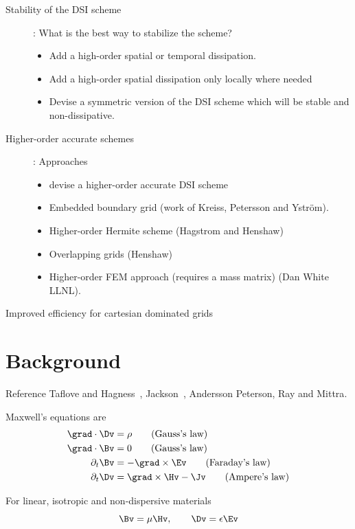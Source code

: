 \documentclass[10pt]{article}
\begin{document}
\begin{description}
  \item[Stability of the DSI scheme] : What is the best way to stabilize the scheme?
    \begin{itemize}
       \item Add a high-order spatial or temporal dissipation.
       \item Add a high-order spatial dissipation only locally where needed
       \item Devise a symmetric version of the DSI scheme which will be stable and non-dissipative.
    \end{itemize}
  \item[Higher-order accurate schemes]: Approaches
    \begin{itemize}
       \item devise a higher-order accurate DSI scheme
       \item Embedded boundary grid (work of Kreiss, Petersson and Ystr\"om).
       \item Higher-order Hermite scheme (Hagstrom and Henshaw)
       \item Overlapping grids (Henshaw)
       \item Higher-order FEM approach (requires a mass matrix) (Dan White LLNL).
    \end{itemize}
  \item[Improved efficiency for cartesian dominated grids]
\end{description}

\section{Background}

Reference Taflove and Hagness~\cite{Taflove2000}, Jackson~\cite{Jackson}, Andersson\cite{Andersson2001}
Peterson, Ray and Mittra\cite{Peterson98}.

Maxwell's equations are
\begin{align}
  \grad\cdot \Dv & = \rho \qquad\mbox{(Gauss's law)} \\
  \grad\cdot\Bv & = 0 \qquad\mbox{(Gauss's law)} \\
  \partial_t \Bv &= -\grad\times\Ev \qquad\mbox{(Faraday's law)} \\
  \partial_t \Dv &=  \grad\times\Hv -\Jv \qquad\mbox{(Ampere's law)}
\end{align}

For linear, isotropic and non-dispersive materials
\[
    \Bv = \mu \Hv, \qquad \Dv = \eps \Ev
\]
\end{document}
